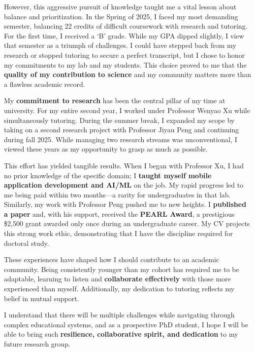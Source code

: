 \documentclass[12pt, letterpaper]{article}
\begin{document}
However, this aggressive pursuit of knowledge taught me a vital lesson about balance and prioritization. In the Spring of 2025, I faced my most demanding semester, balancing 22 credits of difficult coursework with research and tutoring. For the first time, I received a `B' grade. While my GPA dipped slightly, I view that semester as a triumph of challenges. I could have stepped back from my research or stopped tutoring to secure a perfect transcript, but I chose to honor my commitments to my lab and my students. This choice proved to me that the \textbf{quality of my contribution to science} and my community matters more than a flawless academic record.

My \textbf{commitment to research} has been the central pillar of my time at university. For my entire second year, I worked under Professor Wenyao Xu while simultaneously tutoring. During the summer break, I expanded my scope by taking on a second research project with Professor Jiyau Peng and continuing during fall 2025. While managing two research streams was unconventional, I viewed these years as my opportunity to grasp as much as possible.

This effort has yielded tangible results. When I began with Professor Xu, I had no prior knowledge of the specific domain; I \textbf{taught myself mobile application development and AI/ML} on the job. My rapid progress led to me being paid within two months---a rarity for undergraduates in that lab. Similarly, my work with Professor Peng pushed me to new heights. I \textbf{published a paper} and, with his support, received the \textbf{PEARL Award}, a prestigious \$2,500 grant awarded only once during an undergraduate career. My CV projects this strong work ethic, demonstrating that I have the discipline required for doctoral study.

These experiences have shaped how I should contribute to an academic community. Being consistently younger than my cohort has required me to be adaptable, learning to listen and \textbf{collaborate effectively} with those more experienced than myself. Additionally, my dedication to tutoring reflects my belief in mutual support.

I understand that there will be multiple challenges while navigating through complex educational systems, and as a prospective PhD student, I hope I will be able to bring such \textbf{resilience, collaborative spirit, and dedication} to my future research group.
\end{document}
